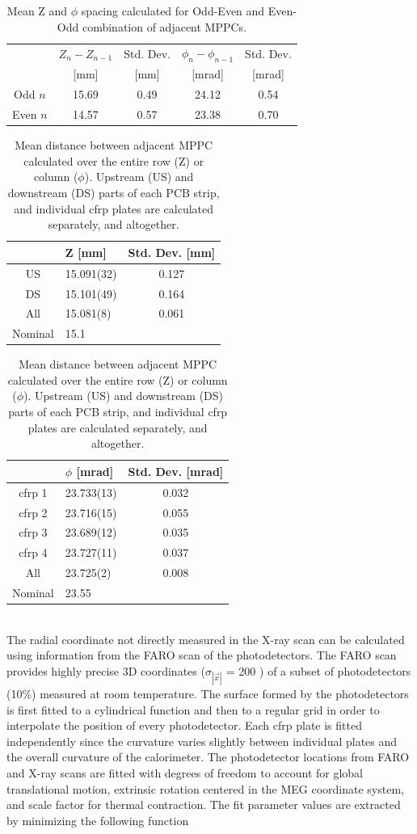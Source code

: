 \begin{table}
\begin{tabular}{ccccc}
 & $Z_{n} - Z_{n-1}$ &Std. Dev.& $\phi_{n} - \phi_{n-1}$ & Std. Dev. \\
 & [mm] &[mm]& [mrad]& [mrad]\\
\hline
Odd  $n$ & 15.69 & 0.49 & 24.12 & 0.54 \\ 
Even $n$ & 14.57 & 0.57 & 23.38 & 0.70 \\ 
\end{tabular}
\caption{Mean Z and $\phi$ spacing calculated for Odd-Even and Even-Odd
combination  of adjacent MPPCs.}
\label{tab:oddeven}
\end{table}

\begin{table}
\begin{tabular}{clc}
   & Z [mm] &Std. Dev. [mm] \\
\hline
US     & 15.091(32)& 0.127  \\
DS     & 15.101(49)& 0.164  \\
All    & 15.081(8) & 0.061  \\
Nominal& 15.1      &
\end{tabular}

\begin{tabular}{clc}
   & $\phi$ [mrad] &Std. Dev. [mrad] \\
\hline
cfrp 1     & 23.733(13)& 0.032  \\
cfrp 2     & 23.716(15)& 0.055  \\
cfrp 3     & 23.689(12)& 0.035  \\
cfrp 4     & 23.727(11)& 0.037  \\
All        & 23.725(2) & 0.008  \\
Nominal    & 23.55 &     
\end{tabular}
\label{tab:avgspacing}
\caption{Mean distance between adjacent MPPC calculated over the entire row (Z) or 
column ($\phi$). Upstream (US) and downstream (DS) parts of each PCB strip, and
individual cfrp plates are calculated separately, and altogether.}
\end{table}

\\
The radial coordinate not directly measured in the X-ray scan can be
calculated using information from the FARO scan of the photodetectors.
The FARO scan provides highly precise 3D coordinates ($\sigma_{|\vec{x}|}$ = 200
\micron) of a subset of photodetectors (10\%) measured
at room temperature.  The surface formed by the photodetectors is
first fitted to a cylindrical function and then to a regular grid in
order to interpolate the position of every  photodetector.  Each cfrp
plate is fitted independently since the curvature varies slightly
between individual plates and the overall curvature of the
calorimeter.  The photodetector locations from FARO and X-ray scans
are fitted with degrees of freedom to account
for global translational motion, extrinsic rotation centered in the
MEG coordinate  system, and scale factor for thermal contraction. The
fit parameter values are extracted by minimizing the following
function

